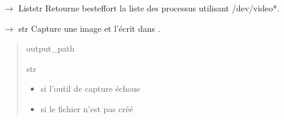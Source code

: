 \documentclass[letterpaper,10pt,french]{sphinxmanual}
\begin{document}
\begin{fulllineitems}
\begin{fulllineitems}
\label{\detokenize{api/hardware.platform:hardware.platform.pi_camera.PiCamera.detect_blocking_processes}}
\pysigstartsignatures
\pysiglinewithargsret
{}
{}
{{ $\rightarrow$ List\DUrole{p}{{[}}str\DUrole{p}{{]}}}}
\pysigstopsignatures
\sphinxAtStartPar
Retourne best\sphinxhyphen{}effort la liste des processus utilisant /dev/video*.

\end{fulllineitems}


\begin{fulllineitems}
\label{\detokenize{api/hardware.platform:hardware.platform.pi_camera.PiCamera.capture}}
\pysigstartsignatures
\pysiglinewithargsret
{}
{}
{{ $\rightarrow$ str}}
\pysigstopsignatures
\sphinxAtStartPar
Capture une image et l’écrit dans .
\begin{quote}\begin{description}
\sphinxAtStartPar
output\_path

\sphinxAtStartPar
str

\begin{itemize}
\item {} 
\sphinxAtStartPar
{} \textendash{} si l’outil de capture échoue

\item {} 
\sphinxAtStartPar
{} \textendash{} si le fichier n’est pas créé

\end{itemize}

\end{description}\end{quote}

\end{fulllineitems}


\end{fulllineitems}
\end{document}
